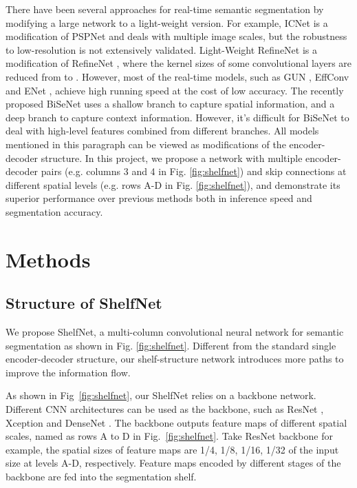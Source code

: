 \documentclass[10pt,twocolumn,letterpaper]{article}
\begin{document}
There have been several approaches for real-time semantic segmentation by modifying a large network to a light-weight version. For example, ICNet \cite{zhao2017icnet} is a modification of PSPNet and deals with multiple image scales, but the robustness to low-resolution is not extensively validated. Light-Weight RefineNet is a modification of RefineNet \cite{nekrasov2018light}, where the kernel sizes of some convolutional layers are reduced from  to . However, most of the real-time models, such as GUN \cite{mazzini2018guided}, EffConv \cite{romera2017efficient} and ENet \cite{paszke2016enet}, achieve high running speed at the cost of low accuracy. The recently proposed BiSeNet
\cite{yu2018bisenet} uses a shallow branch to capture spatial information, and a deep branch to capture context information. However, it's difficult for BiSeNet to deal with high-level features combined from different branches. All models mentioned in this paragraph can be viewed as modifications of the encoder-decoder structure. In this project, we propose a network with multiple encoder-decoder pairs (e.g. columns 3 and 4 in Fig. \ref{fig:shelfnet}) and skip connections at different spatial levels (e.g. rows A-D in Fig. \ref{fig:shelfnet}), and demonstrate its superior performance over previous methods both in inference speed and segmentation accuracy.

\section{Methods}
\label{methods}
\subsection{Structure of ShelfNet}
We propose ShelfNet, a multi-column convolutional neural network for semantic segmentation as shown in Fig. \ref{fig:shelfnet}. Different from the standard single encoder-decoder structure, our shelf-structure network introduces more paths to improve the information flow. 
  
As shown in Fig~\ref{fig:shelfnet}, our ShelfNet relies on a backbone network. Different CNN architectures can be used as the backbone, such as ResNet \cite{he2016deep}, Xception \cite{chollet2017xception} and DenseNet \cite{huang2017densely}. The backbone outputs feature maps of different spatial scales, named as rows A to D in Fig.~\ref{fig:shelfnet}. Take ResNet backbone for example, the spatial sizes of feature maps are 1/4, 1/8, 1/16, 1/32 of the input size at levels A-D, respectively. Feature maps encoded by different stages of the backbone are fed into the segmentation shelf. 
  
\end{document}
